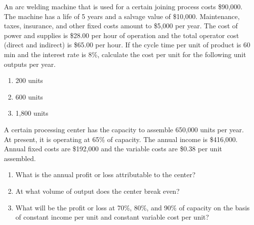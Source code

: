\begin{exercises}
    \begin{exercise}
    \label{sea-08-28}
        An arc welding machine that is used for a certain joining process costs \$90,000. The machine has a life of 5 years and a salvage value of \$10,000. Maintenance, taxes, insurance, and other fixed costs amount to \$5,000 per year. The cost of power and supplies is \$28.00 per hour of operation and the total operator cost (direct and indirect) is \$65.00 per hour. If the cycle time per unit of product is 60 min and the interest rate is 8\%, calculate the cost per unit for the following unit outputs per year.
        \begin{enumerate}[label=\alph*)]
            \item 200 units
            \item 600 units
            \item 1,800 units
        \end{enumerate}
    \end{exercise}
    \begin{solution}
    \end{solution}
    
    \begin{exercise}
    \label{sea-08-29}
        A certain processing center has the capacity to assemble 650,000 units per year. At present, it is operating at 65\% of capacity. The annual income is \$416,000. Annual fixed costs are \$192,000 and the variable costs are \$0.38 per unit assembled.
        \begin{enumerate}[label=\alph*)]
            \item What is the annual profit or loss attributable to the center?
            \item At what volume of output does the center break even?
            \item What will be the profit or loss at 70\%, 80\%, and 90\% of capacity on the basis of constant income per unit and constant variable cost per unit?
        \end{enumerate}
    \end{exercise}
    \begin{solution}
    \end{solution}
    

\end{exercises}
